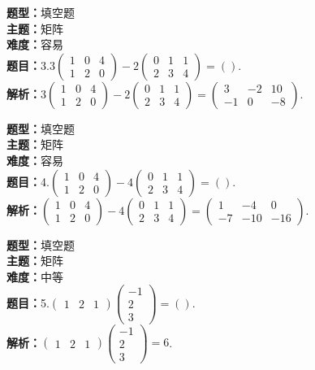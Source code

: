 \documentclass{ctexart}
\newenvironment{question}[5]{%
	\noindent\textbf{题型：}#1\\
	\textbf{主题：}#2\\
	\textbf{难度：}#3\\
	\textbf{题目：}#4\\
	\textbf{解析：}#5\\
	\vspace{1em}
}{}
\begin{document}
	\begin{question}
		{填空题}
		{矩阵}
		{容易}
		{3.\(3\left(\begin{array}{lll}1 & 0 & 4 \\ 1 & 2 & 0\end{array}\right)-2\left(\begin{array}{lll}0 & 1 & 1 \\ 2 & 3 & 4\end{array}\right)=()\).}
		{\(3\left(\begin{array}{lll}1 & 0 & 4 \\ 1 & 2 & 0\end{array}\right)-2\left(\begin{array}{lll}0 & 1 & 1 \\ 2 & 3 & 4\end{array}\right)=\left(\begin{array}{ccc}3 & -2 & 10 \\ -1 & 0 & -8\end{array}\right)\).}
	\end{question}
	
	\begin{question}
		{填空题}
		{矩阵}
		{容易}
		{4.\(\left(\begin{array}{lll}1 & 0 & 4 \\ 1 & 2 & 0\end{array}\right)-4\left(\begin{array}{lll}0 & 1 & 1 \\ 2 & 3 & 4\end{array}\right)=()\).}
		{\(\left(\begin{array}{lll}1 & 0 & 4 \\ 1 & 2 & 0\end{array}\right)-4\left(\begin{array}{lll}0 & 1 & 1 \\ 2 & 3 & 4\end{array}\right)=\left(\begin{array}{ccc}1 & -4 & 0 \\ -7 & -10 & -16\end{array}\right)\).}
	\end{question}
	
	\begin{question}
		{填空题}
		{矩阵}
		{中等}
		{5.\(\left(\begin{array}{lll}1 & 2 & 1\end{array}\right)\left(\begin{array}{c}-1 \\ 2 \\ 3\end{array}\right)=()\).}
		{\(\left(\begin{array}{lll}1 & 2 & 1\end{array}\right)\left(\begin{array}{c}-1 \\ 2 \\ 3\end{array}\right)=6\).}
	\end{question}
	
\end{document}
